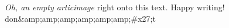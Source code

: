 \textit{Oh, an empty articimage} right onto this text. Happy writing! 
don&amp;amp;amp;amp;amp;amp;#x27;t